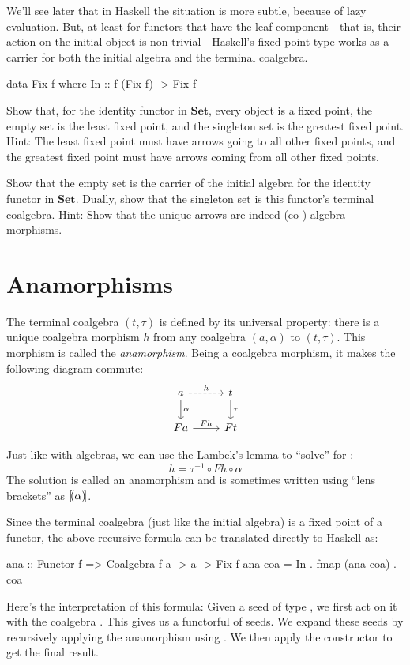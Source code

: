\documentclass[DaoFP]{subfiles}
\begin{document}
We'll see later that in Haskell the situation is more subtle, because of lazy evaluation. But, at least for functors that have the leaf component---that is, their action on the initial object is non-trivial---Haskell's fixed point type works as a carrier for both the initial algebra and the terminal coalgebra.
\begin{haskell}
data Fix f where
  In :: f (Fix f) -> Fix f
\end{haskell}

\begin{exercise}
Show that, for the identity functor in $\mathbf{Set}$, every object is a fixed point, the empty set is the least fixed point, and the singleton set is the greatest fixed point. Hint: The least fixed point must have arrows going to all other fixed points, and the greatest fixed point must have arrows coming from all other fixed points.
\end{exercise}

\begin{exercise}
Show that the empty set is the carrier of the initial algebra for the identity functor in $\mathbf{Set}$. Dually, show that the singleton set is this functor's terminal coalgebra. Hint: Show that the unique arrows are indeed (co-) algebra morphisms.
\end{exercise}

\section{Anamorphisms}

The terminal coalgebra $(t, \tau)$ is defined by its universal property: there is a unique coalgebra morphism $h$ from any coalgebra $(a, \alpha)$ to $(t, \tau)$.  This morphism is called the \emph{anamorphism}. Being a coalgebra morphism, it makes the following diagram commute:
\[
 \begin{tikzcd}
 a 
 \arrow[r, dashed, "h"]
 \arrow[d, "\alpha"]
 & t
\arrow[d, "\tau"]
 \\
 F a
 \arrow[r,  "F h"]
 & F t
  \end{tikzcd}
\]
 
 Just like with algebras, we can use the Lambek's lemma to ``solve'' for :
 \[ h = \tau^{-1} \circ F h \circ \alpha \]
 The solution is called an anamorphism and is sometimes written using \index{$\llens \rlens$}``lens brackets'' as $\mathopen{[\!(} \alpha \mathclose{)\!]}$.
 
 Since the terminal coalgebra (just like the initial algebra) is a fixed point of a functor, the above recursive formula can be translated directly to Haskell as:
 \begin{haskell}
ana :: Functor f => Coalgebra f a -> a -> Fix f
ana coa = In . fmap (ana coa) . coa 
\end{haskell}
Here's the interpretation of this formula: Given a seed of type , we first act on it with the coalgebra . This gives us a functorful of seeds. We expand these seeds by recursively applying the anamorphism using . We then apply the constructor  to get the final result.
 
\end{document}

